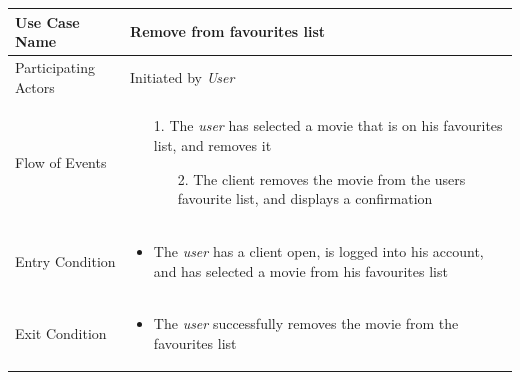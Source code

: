 \begin{center}
	\begin{tabular}{ | l | p{10cm} |  }
		 \hline
		Use Case Name & Remove from favourites list \\ \hline
		Participating Actors & Initiated by \emph{User} \\ \hline
		Flow of Events & \begin{enumerate}
						\item[1.] The \emph{user} has selected a movie that is on his favourites list, and removes it
						\begin{enumerate}
							\item[2.] The client removes the movie from the users favourite list, and displays a confirmation
						\end{enumerate}
					\end{enumerate} \\ \hline
		Entry Condition & \begin{itemize}
						\item The \emph{user} has a client open, is logged into his account, and has selected a movie from his favourites list
					\end{itemize} \\ \hline
		Exit Condition & \begin{itemize}
						\item The \emph{user} successfully removes the movie from the favourites list
					\end{itemize} \\
		\hline
	\end{tabular}
\end{center}

